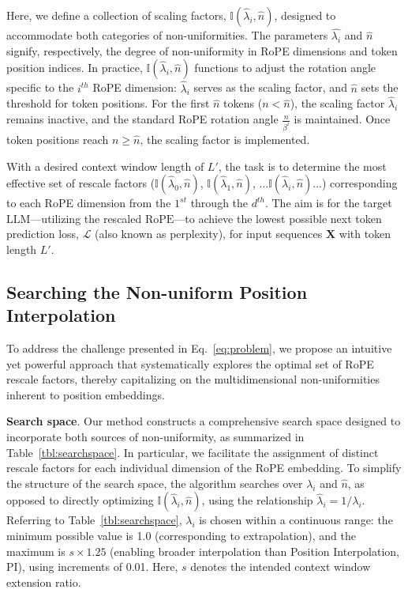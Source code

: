 Here, we define a collection of scaling factors, $\mathbb{I}(\hat{\lambda}_{i},\hat{n})$, designed to accommodate both categories of non-uniformities. The parameters $\hat{\lambda_i}$ and $\hat{n}$ signify, respectively, the degree of non-uniformity in RoPE dimensions and token position indices. In practice, $\mathbb{I}(\hat{\lambda}_{i},\hat{n})$ functions to adjust the rotation angle specific to the $i^{th}$ RoPE dimension: $\hat\lambda_{i}$ serves as the scaling factor, and $\hat{n}$ sets the threshold for token positions. For the first $\hat{n}$ tokens ($n<\hat{n}$), the scaling factor $\hat\lambda_{i}$ remains inactive, and the standard RoPE rotation angle $\frac{n}{\beta^i}$ is maintained. Once token positions reach $n\ge\hat{n}$, the scaling factor is implemented.

With a desired context window length of $L'$, the task is to determine the most effective set of rescale factors ($\mathbb{I}(\hat{\lambda}_{0},\hat{n})$, $\mathbb{I}(\hat{\lambda}_{1},\hat{n})$, ...$\mathbb{I}(\hat{\lambda}_{i},\hat{n})$...) corresponding to each RoPE dimension from the $1^{st}$ through the $d^{th}$. The aim is for the target $\text{LLM}$—utilizing the rescaled $\text{RoPE}$—to achieve the lowest possible next token prediction loss, $\mathcal{L}$ (also known as perplexity), for input sequences $\mathbf{X}$ with token length $L'$.

\subsection{Searching the Non-uniform Position Interpolation}

To address the challenge presented in Eq.~\ref{eq:problem}, we propose an intuitive yet powerful approach that systematically explores the optimal set of RoPE rescale factors, thereby capitalizing on the multidimensional non-uniformities inherent to position embeddings.

\textbf{Search space}. Our method constructs a comprehensive search space designed to incorporate both sources of non-uniformity, as summarized in Table~\ref{tbl:searchspace}. In particular, we facilitate the assignment of distinct rescale factors for each individual dimension of the RoPE embedding. To simplify the structure of the search space, the algorithm searches over $\lambda_i$ and $\hat{n}$, as opposed to directly optimizing $\mathbb{I}(\hat{\lambda}_{i},\hat{n})$, using the relationship $\hat{\lambda}_{i}=1/\lambda_i$. Referring to Table~\ref{tbl:searchspace}, $\lambda_i$ is chosen within a continuous range: the minimum possible value is 1.0 (corresponding to extrapolation), and the maximum is $s\times1.25$ (enabling broader interpolation than Position Interpolation, PI), using increments of 0.01. Here, $s$ denotes the intended context window extension ratio.

